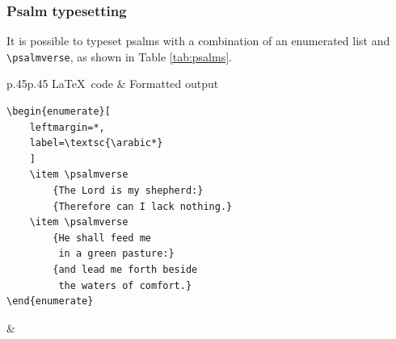 \documentclass{article}
\begin{document}
\subsubsection{Psalm typesetting}

It is possible to typeset psalms with a combination of an enumerated list and \lstinline{\psalmverse}, as shown in Table \ref{tab:psalms}.

\begin{table}[h]
\centering
\begin{xtabular}{p{.45\textwidth}p{.45\textwidth}}
\toprule
\LaTeX\ code & Formatted output \\
\midrule
\begin{lstlisting}
\begin{enumerate}[
	leftmargin=*,
	label=\textsc{\arabic*}
	]
	\item \psalmverse
		{The Lord is my shepherd:}
		{Therefore can I lack nothing.}
	\item \psalmverse
		{He shall feed me
		 in a green pasture:}
 		{and lead me forth beside
 		 the waters of comfort.}
\end{enumerate}
\end{lstlisting}
&
\\
\bottomrule
\end{xtabular}
\caption{Typesetting psalms with an enumerated list and \lstinline{\\psalmverse}.}
\label{tab:psalms}
\end{table}
\end{document}
